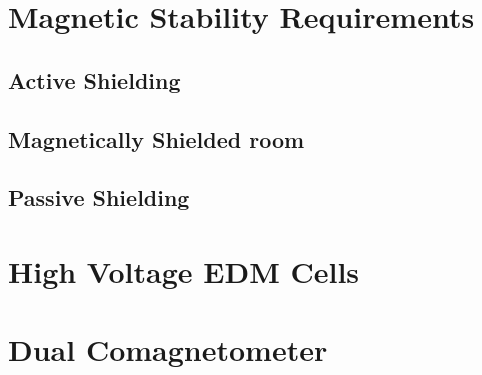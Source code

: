 \section{Magnetic Stability Requirements}
\subsection{Active Shielding}

\subsection{Magnetically Shielded room}

\subsection{Passive Shielding}


\section{High Voltage EDM Cells}

\section{Dual Comagnetometer}



